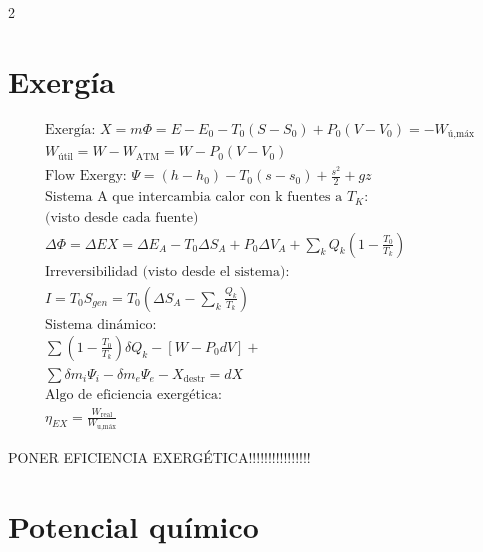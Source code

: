 \documentclass[9pt]{article}
\begin{document}
\begin{multicols}{2}
\section{Exergía}

\begin{gather*}
  \text{Exergía: } X=m\Phi= E-E_0 - T_0 (S-S_0) + P_0(V-V_0) = -W_\text{ú,máx}\\ %
  W_\text{útil}= W-W_{\text{ATM}}= W - P_0(V-V_0)\\
  \text{Flow Exergy: } \Psi = (h-h_0)-T_0(s-s_0)+\frac{s^2}{2} +gz\\
    \text{Sistema A que intercambia calor con k fuentes a $T_K$:}\\
    \text{(visto desde cada fuente)}\\
  \Delta \Phi = \Delta EX = \Delta E_A - T_0 \Delta S_A + P_0 \Delta V_A + \sum_{k} Q_k(1 - \frac{T_0}{T_k})\\
\text{Irreversibilidad (visto desde el sistema):} \\
  I = T_0 S_{gen}
= T_0 \left( \Delta S_A - \sum_k \frac{Q_k}{T_k} \right)\\
  \text{Sistema dinámico:}\\
  \sum\left(1-\frac{T_0}{T_k}\right)\delta Q_k - [W-P_0  dV] +\\ \sum\delta m_i\Psi_i- \delta m_e\Psi_e-X_\text{destr}=dX\\
  \text{Algo de eficiencia exergética:}\\
  \eta_{EX} = \frac{W_\text{real}}{W_\text{u,máx}}
\end{gather*}

PONER EFICIENCIA EXERGÉTICA!!!!!!!!!!!!!!!!

\section{Potencial químico}


\end{multicols}
\end{document}
